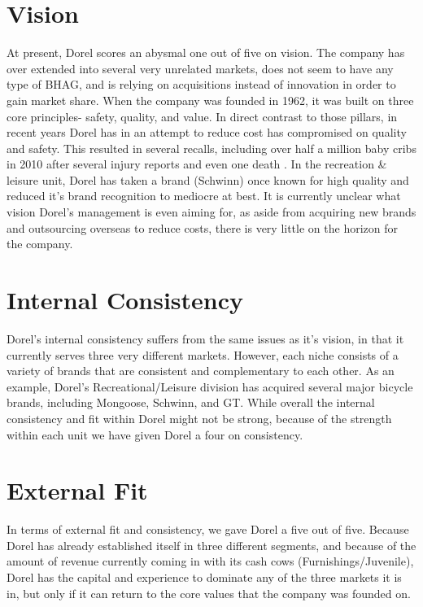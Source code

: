 \section{Vision}
At present, Dorel scores an abysmal one out of five on vision.  The company has over extended into several very unrelated markets, does not seem to have any type of BHAG, and is relying on acquisitions instead of innovation in order to gain market share.  When the company was founded in 1962, it was built on three core principles- safety, quality, and value.  In direct contrast to those pillars, in recent years Dorel has in an attempt to reduce cost has compromised on quality and safety. This resulted in several recalls, including over half a million baby cribs in 2010 after several injury reports and even one death \cite{Commission2010}.  In the recreation \& leisure unit, Dorel has taken a brand (Schwinn) once known for high quality and reduced it’s brand recognition to mediocre at best.  It is currently unclear what vision Dorel’s management is even aiming for, as aside from acquiring new brands and outsourcing overseas to reduce costs, there is very little on the horizon for the company.  

\section{Internal Consistency}
Dorel’s internal consistency suffers from the same issues as it’s vision, in that it currently serves three very different markets.  However, each niche consists of a variety of brands that are consistent and complementary to each other.  As an example, Dorel’s Recreational/Leisure division has acquired several major bicycle brands, including Mongoose, Schwinn, and GT.  While overall the internal consistency and fit within Dorel might not be strong, because of the strength within each unit we have given Dorel a four on consistency.

\section{External Fit}
In terms of  external fit and consistency, we gave Dorel a five out of five.  Because Dorel has already established itself in three different segments, and because of the amount of revenue currently coming in with its cash cows (Furnishings/Juvenile), Dorel has the capital and experience to dominate any of the three markets it is in, but only if it can return to the core values that the company was founded on.

